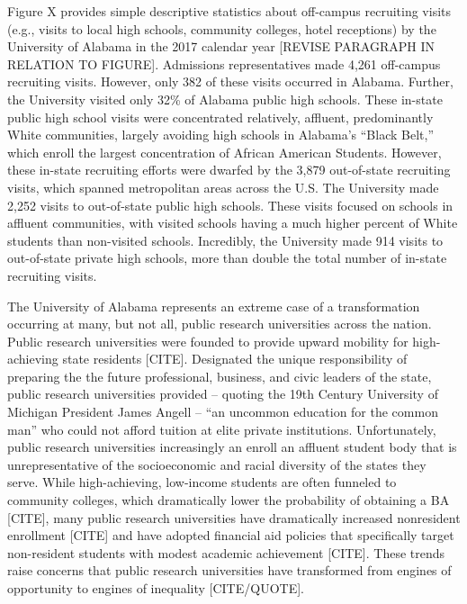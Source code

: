 \documentclass[twoside]{article}
\begin{document}
Figure X provides simple descriptive statistics about off-campus recruiting visits (e.g., visits to local high schools, community colleges, hotel receptions) by the University of Alabama in the 2017 calendar year [REVISE PARAGRAPH IN RELATION TO FIGURE].  Admissions representatives made 4,261 off-campus recruiting visits.  However, only 382 of these visits occurred in Alabama.  Further, the University visited only 32\% of Alabama public high schools. These in-state public high school visits were concentrated relatively, affluent, predominantly White communities, largely avoiding high schools in Alabama's ``Black Belt,'' which enroll the largest concentration of African American Students.  However, these in-state recruiting efforts were dwarfed by the 3,879 out-of-state recruiting visits, which spanned metropolitan areas across the U.S. The University made 2,252 visits to out-of-state public high schools. These visits focused on schools in affluent communities, with visited schools having a much higher percent of White students than non-visited schools.  Incredibly, the University made 914 visits to out-of-state private high schools, more than double the total number of in-state recruiting visits.

The University of Alabama represents an extreme case of a transformation occurring at many, but not all, public research universities across the nation.  Public research universities were founded to provide upward mobility for high-achieving state residents [CITE]. Designated the unique responsibility of preparing the the future professional, business, and civic leaders of the state, public research universities provided -- quoting the 19th Century University of Michigan President James Angell -- ``an uncommon education for the common man'' who could not afford tuition at elite private institutions.  Unfortunately, public research universities increasingly an enroll an affluent student body that is unrepresentative of the socioeconomic and racial diversity of the states they serve. While high-achieving, low-income students are often funneled to community colleges, which dramatically lower the probability of obtaining a BA [CITE], many public research universities have dramatically increased nonresident enrollment [CITE] and have adopted financial aid policies that specifically target non-resident students with modest academic achievement [CITE]. These trends raise concerns that public research universities have transformed from engines of opportunity to engines of inequality [CITE/QUOTE].
\end{document}
